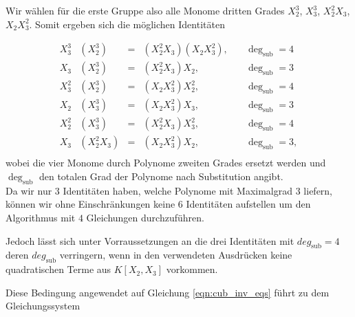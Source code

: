 \documentclass[a4paper,oneside, 11pt, openany%
]{article}
\theoremstyle{custom}
\theoremstyle{custom}
\begin{document}
	Wir wählen für die erste Gruppe also alle Monome dritten Grades $X_{2}^3$, $X_{3}^3$, $X_{2}^2X_{3}$, $X_{2}X_{3}^2$.
	Somit ergeben sich die möglichen Identitäten
	
	\begin{equation*}\label{eqn:4C3id}
		\begin{alignedat}{4}
			X_{3}^3&	\left( X_{2}^3\right)  &=& \left( X_{2}^2X_{3}\right) 	\left( X_{2}X_{3}^2\right),&\quad \deg_{\text{sub}}=4 \\
			X_{3}&\left( X_{2}^3\right) &=&\left( X_{2}^2X_{3}\right) X_{2},&\quad \deg_{\text{sub}}=3\\
			X_{3}^2&	\left( X_{2}^3\right)  &=& \left(  X_{2}X_{3}^2\right) 	X_{2}^2,&\quad \deg_{\text{sub}}=4\\
			X_{2}&	\left( X_{3}^3\right)  &=& \left( X_{2}X_{3}^2\right) 	X_{3},&\quad \deg_{\text{sub}}=3\\
			X_{2}^2&	\left( X_{3}^3\right)  &=& \left( X_{2}^2X_{3}\right) 	X_{3}^2,&\quad \deg_{\text{sub}}=4\\
			X_{3}&	\left( X_{2}^2X_{3}\right)  &=& \left( X_{2}X_{3}^2\right) 	X_{2},&\quad \deg_{\text{sub}}=3,\\
		\end{alignedat}
	\end{equation*}
	wobei die vier Monome durch Polynome zweiten Grades ersetzt werden und $\deg_{\text{sub}}$ den totalen Grad der Polynome nach Substitution angibt.\\
	
	Da wir nur 3 Identitäten haben, welche Polynome mit Maximalgrad $3$ liefern, können wir ohne Einschränkungen keine $6$ Identitäten aufstellen um den Algorithmus mit $4$ Gleichungen durchzuführen.
	
	Jedoch lässt sich unter Vorraussetzungen an die drei Identitäten mit $deg_\text{sub} = 4$ deren $deg_\text{sub}$ verringern, wenn in den verwendeten Ausdrücken keine quadratischen Terme aus $K[X_2,X_3]$ vorkommen.
	
	Diese Bedingung angewendet auf Gleichung \eqref{eqn:cub_inv_eqs} führt zu dem Gleichungssystem
	
\end{document}
